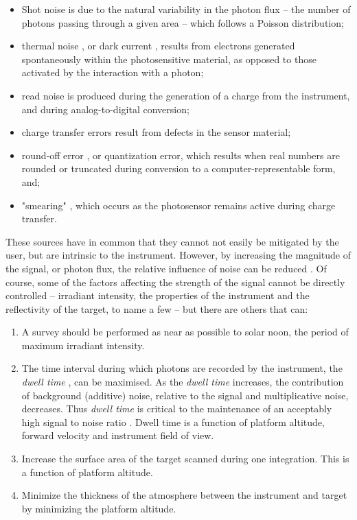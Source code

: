 \begin{itemize}
\item Shot noise \cite{Barducci2007} is due to the natural variability in the photon flux -- the number of photons passing through a given area -- which follows a Poisson distribution;
\item thermal noise \cite{Barducci2007}, or dark current \cite{Rogass2011}, results from electrons generated spontaneously within the photosensitive material, as opposed to those activated by the interaction with a photon;
\item read noise \cite{Barducci2007} is produced during the generation of a charge from the instrument, and during analog-to-digital conversion;
\item charge transfer errors \cite{Barducci2007} result from defects in the sensor material;
\item round-off error \cite{Barducci2007}, or quantization error, which results when real numbers are rounded or truncated during conversion to a computer-representable form, and;
\item "smearing" \cite{Barducci2007,Ruyten1999}, which occurs as the photosensor remains active during charge transfer.
\end{itemize}

These sources have in common that they cannot not easily be mitigated by the user, but are intrinsic to the instrument. However, by increasing the magnitude of the signal, or photon flux, the relative influence of noise can be reduced \cite{Dor2012}. Of course, some of the factors affecting the strength of the signal cannot be directly controlled -- irradiant intensity, the properties of the instrument and the reflectivity of the target, to name a few -- but there are others that can:

\begin{enumerate}
\item A survey should be performed as near as possible to solar noon, the period of maximum irradiant intensity. 
\item The time interval during which photons are recorded by the instrument, the \emph{dwell time} \cite{Gupta2018,Goetz1985,Dor2012}, can be maximised. As the \emph{dwell time} increases, the contribution of background (additive) noise, relative to the signal and multiplicative noise, decreases. Thus \emph{dwell time} is critical to the maintenance of an acceptably high signal to noise ratio \cite{F.MarkDanson1996,Avery1992,Rogass2014}. Dwell time is a function of platform altitude, forward velocity and instrument field of view.
\item Increase the surface area of the target scanned during one integration. This is a function of platform altitude.
\item Minimize the thickness of the atmosphere between the instrument and target by minimizing the platform altitude.
\end{enumerate}

